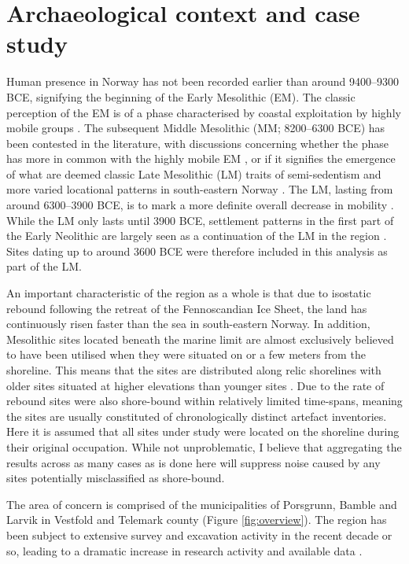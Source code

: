 \documentclass[12pt, a4paper]{article}
\begin{document}
\section{Archaeological context and case study}
Human presence in Norway has not been recorded earlier than around 9400--9300 BCE, signifying the beginning of the Early Mesolithic (EM). The classic perception of the EM is of a phase characterised by coastal exploitation by highly mobile groups \citep[e.g.][]{bjerck2008, fuglestvedt2012}. The subsequent Middle Mesolithic (MM; 8200--6300 BCE) has been contested in the literature, with discussions concerning whether the phase has more in common with the highly mobile EM \citep{mansrud2014}, or if it signifies the emergence of what are deemed classic Late Mesolithic (LM) traits of semi-sedentism and more varied locational patterns in south-eastern Norway \citep{solheim2016}. The LM, lasting from around 6300--3900 BCE, is to mark a more definite overall decrease in mobility \citep{bjerck2008, glorstad2010}. While the LM only lasts until 3900 BCE, settlement patterns in the first part of the Early Neolithic are largely seen as a continuation of the LM in the region \citep{glorstad2009}. Sites dating up to around 3600 BCE were therefore included in this analysis as part of the LM. \par
An important characteristic of the region as a whole is that due to isostatic rebound following the retreat of the Fennoscandian Ice Sheet, the land has continuously risen faster than the sea in south-eastern Norway. In addition, Mesolithic sites located beneath the marine limit are almost exclusively believed to have been utilised when they were situated on or a few meters from the shoreline. This means that the sites are distributed along relic shorelines with older sites situated at higher elevations than younger sites \citep{breivik2018, solheim2020}. Due to the rate of rebound sites were also shore-bound within relatively limited time-spans, meaning the sites are usually constituted of chronologically distinct artefact inventories. Here it is assumed that all sites under study were located on the shoreline during their original occupation. While not unproblematic, I believe that aggregating the results across as many cases as is done here will suppress noise caused by any sites potentially misclassified as shore-bound. \par
The area of concern is comprised of the municipalities of Porsgrunn, Bamble and Larvik in Vestfold and Telemark county (Figure \ref{fig:overview}). The region has been subject to extensive survey and excavation activity in the recent decade or so, leading to a dramatic increase in research activity and available data \citep[e.g.][]{solheim2013, jaksland2014, melvold2014, reitan2014, solheim2017}.
\end{document}
